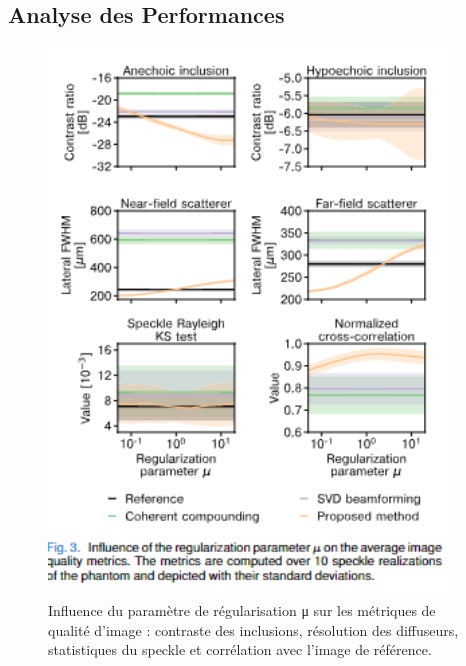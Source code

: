 \documentclass[12pt,a4paper]{article}
\begin{document}
\subsection{Analyse des Performances}
\begin{figure}[H]
    \centering
    \includegraphics[width=0.95\textwidth]{paper/fig_3.png}
    \caption{Influence du paramètre de régularisation μ sur les métriques de qualité d'image : contraste des inclusions, résolution des diffuseurs, statistiques du speckle et corrélation avec l'image de référence.}
\end{figure}
\end{document}
